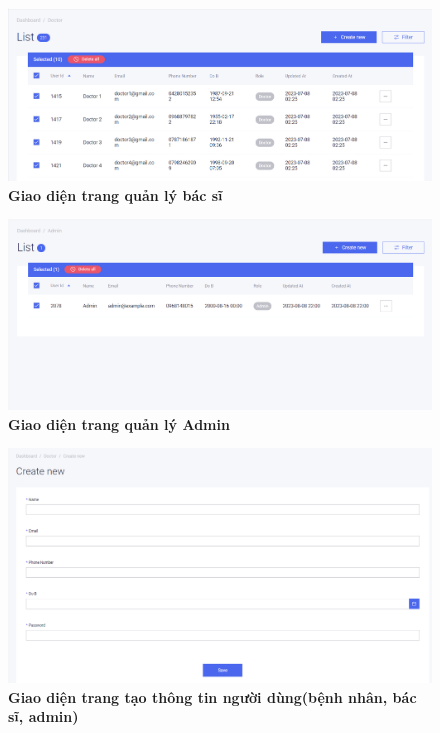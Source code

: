\begin{figure}[H]
  \centering
  \includegraphics[scale=0.5]{Images/server/webUI/list_doctor.PNG}
  \caption[Giao diện trang quản lý bác sĩ]{\bfseries \fontsize{12pt}{0pt}\selectfont Giao diện trang quản lý bác sĩ}
  \label{list_doctor} %
\end{figure}

\begin{figure}[H]
  \centering
  \includegraphics[scale=0.5]{Images/server/webUI/admin_list.PNG}
  \caption[Giao diện trang quản lý Admin]{\bfseries \fontsize{12pt}{0pt}\selectfont Giao diện trang quản lý Admin}
  \label{admin_list} %
\end{figure}


\begin{figure}[H]
  \centering
  \includegraphics[scale=0.5]{Images/server/webUI/user_create.PNG}
  \caption[Giao diện trang tạo thông tin người dùng(bệnh nhân, bác sĩ, admin)]{\bfseries \fontsize{12pt}{0pt}\selectfont Giao diện trang tạo thông tin người dùng(bệnh nhân, bác sĩ, admin)}
  \label{admin_list} %
\end{figure}

